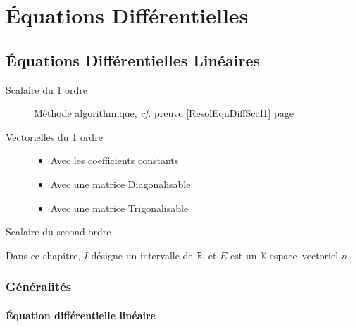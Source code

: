 \documentclass[11pt,a4paper,fleqn,pdftex]{report}
\begin{document}
\part{Équations Différentielles}
\chapter{Équations Différentielles Linéaires}
\begin{methode}
\begin{description}
    \item[Scalaire du 1\ier{} ordre]
                Méthode algorithmique, \textit{cf.} preuve \ref{ResolEquDiffScal1} page \pageref{ResolEquDiffScal1}
    \item[Vectorielles du 1\ier{} ordre] \hfill
    \begin{itemize}\itemsep2pt %
                    \item Avec les coefficients constants
                    \item Avec une matrice Diagonalisable
                    \item Avec une matrice Trigonalisable
    \end{itemize}

    \item[Scalaire du second ordre]
\end{description}

\end{methode}
Dans ce chapitre, $I$ désigne un intervalle de $\mathbb{R}$, et $E$ est un $\mathbb{K}$-espace~vectoriel  $n$.
\section{Généralités} %
\label{sec:ED_generalites}
\subsection{Équation différentielle linéaire} %
\label{sub:equa_diff_lineaire}
\end{document}
